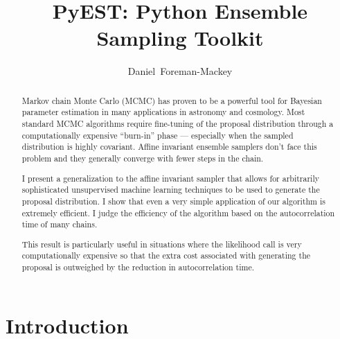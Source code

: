 \documentclass[12pt,preprint]{aastex}
\begin{document}
\title{PyEST: Python Ensemble Sampling Toolkit}
\author{Daniel~Foreman-Mackey}

\begin{abstract}

    Markov chain Monte Carlo (MCMC) has proven to be a powerful tool for Bayesian
    parameter estimation in many applications in astronomy and cosmology.  Most
    standard MCMC algorithms require fine-tuning of the proposal distribution
    through a computationally expensive ``burn-in'' phase --- especially when the
    sampled distribution is highly covariant.
    Affine invariant ensemble samplers don't face this problem and they generally
    converge with fewer steps in the chain.

    I present a generalization to the \citet{Goodman:2010} affine invariant sampler
    that allows for arbitrarily sophisticated unsupervised machine learning techniques
    to be used to generate the proposal distribution.  I show that even a very simple
    application of our algorithm is extremely efficient.  I judge the efficiency
    of the algorithm based on the autocorrelation time of many chains.

    This result is particularly useful in situations where the likelihood call is
    very computationally expensive so that the extra cost associated with generating
    the proposal is outweighed by the reduction in autocorrelation time.

\end{abstract}

\keywords{
}

\section{Introduction}
\end{document}
